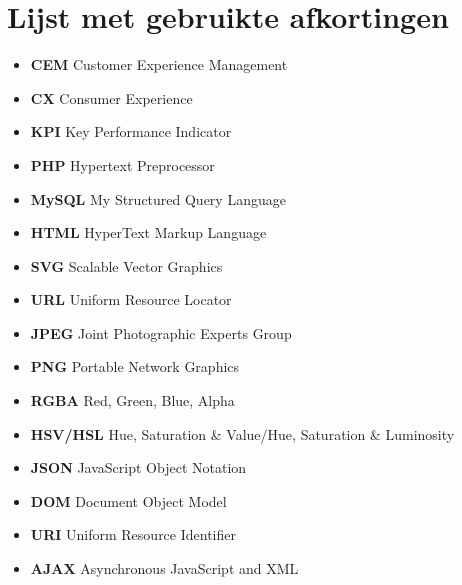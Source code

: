 \chapter{Lijst met gebruikte afkortingen}

\begin{itemize}
\item[] \textbf{CEM} \qquad Customer Experience Management
\item[] \textbf{CX} \qquad Consumer Experience
\item[] \textbf{KPI} \qquad Key Performance Indicator
\item[] \textbf{PHP} \qquad Hypertext Preprocessor
\item[] \textbf{MySQL} \qquad My Structured Query Language
\item[] \textbf{HTML} \qquad HyperText Markup Language
\item[] \textbf{SVG} \qquad Scalable Vector Graphics
\item[] \textbf{URL} \qquad Uniform Resource Locator
\item[] \textbf{JPEG} \qquad Joint Photographic Experts Group
\item[] \textbf{PNG} \qquad Portable Network Graphics
\item[] \textbf{RGBA} \qquad Red, Green, Blue, Alpha
\item[] \textbf{HSV/HSL} \qquad Hue, Saturation \& Value/Hue, Saturation \& Luminosity
\item[] \textbf{JSON} \qquad JavaScript Object Notation
\item[] \textbf{DOM} \qquad Document Object Model
\item[] \textbf{URI} \qquad Uniform Resource Identifier
\item[] \textbf{AJAX} \qquad Asynchronous JavaScript and XML
\end{itemize}	


